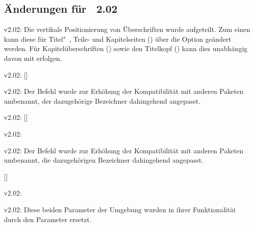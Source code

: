 %
\subsection{Änderungen für \TUDScript~2.02}
\begin{Obsolete}{v2.02:}{}
\printobsoletelist%
%
Die vertikale Positionierung von Überschriften wurde aufgeteilt. Zum einen kann 
diese für Titel"~, Teile- und Kapitelseiten () über 
die Option  geändert werden. Für Kapitelüberschriften
() sowie den Titelkopf () 
kann dies unabhängig davon mit  erfolgen.
\end{Obsolete}

\begin{Obsolete}{v2.02:}{%
  []%
}
\begin{Obsolete}{v2.02:}{}
\printobsoletelist%
%
Der Befehl wurde zur Erhöhung der Kompatibilität mit anderen Paketen umbenannt, 
der dazugehörige Bezeichner dahingehend angepasst.
\end{Obsolete}
\end{Obsolete}

\begin{Obsolete}{v2.02:}{%
  []%
}
\begin{Obsolete}{v2.02:}{}
\begin{Obsolete}{v2.02:}{}
\printobsoletelist%
%
Der Befehl wurde zur Erhöhung der Kompatibilität mit anderen Paketen umbenannt, 
die dazugehörigen Bezeichner dahingehend angepasst.
\end{Obsolete}
\end{Obsolete}
\end{Obsolete}

\begin{Obsolete}{}{[]}
\begin{Obsolete}{v2.02:}{%
}
\begin{Obsolete}{v2.02:}{%
}
\printobsoletelist%
%
Diese beiden Parameter der Umgebung  wurden in ihrer 
Funktionalität durch den Parameter  
ersetzt.
\end{Obsolete}
\end{Obsolete}
\end{Obsolete}



